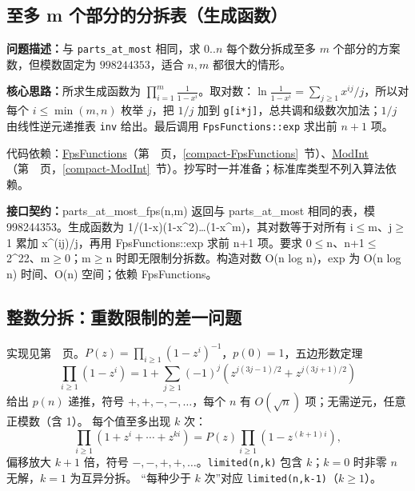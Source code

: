 \Needspace{334pt}

\subsection{至多 m 个部分的分拆表（生成函数）}\label{compact-parts_at_most_fps}

\noindent\textbf{问题描述：}\allowbreak 与 \texttt{parts\_at\_most} 相同，求 $0..n$ 每个数分拆成至多 $m$ 个部分的方案数，但模数固定为 $998244353$，适合 $n,m$ 都很大的情形。

\textbf{核心思路：}\allowbreak 所求生成函数为 $\prod_{i=1}^{m}\frac1{1-x^i}$。取对数：$\ln\frac1{1-x^i}=\sum_{j\ge1}x^{ij}/j$，所以对每个 $i\le\min(m,n)$ 枚举 $j$，把 $1/j$ 加到 \texttt{g[i*j]}，总共调和级数次加法；$1/j$ 由线性逆元递推表 \texttt{inv} 给出。最后调用 \texttt{FpsFunctions::exp} 求出前 $n+1$ 项。

代码依赖：\hyperref[compact-FpsFunctions]{FpsFunctions}（第~\pageref{compact-FpsFunctions}~页，\ref{compact-FpsFunctions}~节）、\hyperref[compact-ModInt]{ModInt}（第~\pageref{compact-ModInt}~页，\ref{compact-ModInt}~节）。抄写时一并准备；标准库类型不列入算法依赖。

{\sloppy{}\noindent\textbf{接口契约：}parts\_at\_most\_fps(n,m) 返回与 parts\_at\_most 相同的表，模 998244353。生成函数为 1/(1-x)(1-x\textasciicircum{}2)…(1-x\textasciicircum{}m)，其对数等于对所有 i$\le$m、j$\ge$1 累加 x\textasciicircum{}(ij)/j，再用 FpsFunctions::exp 求前 n+1 项。要求 0$\le$n、n+1$\le$2\textasciicircum{}22、m$\ge$0；m$\ge$n 时即无限制分拆数。构造对数 O(n log n)，exp 为 O(n log n) 时间、O(n) 空间；依赖 FpsFunctions。\par}



\newpage

\subsection{整数分拆：重数限制的差一问题}\label{knowledge-partitions}
实现见第~\pageref{compact-Partitions}~页。$P(z)=\prod_{i\ge1}(1-z^i)^{-1}$，$p(0)=1$，五边形数定理
\[
\prod_{i\ge1}(1-z^i)=1+\sum_{j\ge1}(-1)^j
\left(z^{j(3j-1)/2}+z^{j(3j+1)/2}\right)
\]
给出 $p(n)$ 递推，符号 $+,+,-,-,\ldots$，每个 $n$ 有 $O(\sqrt n)$ 项；无需逆元，任意正模数（含 1）。
每个值至多出现 $k$ 次：
\[
\prod_{i\ge1}(1+z^i+\cdots+z^{ki})=P(z)\prod_{i\ge1}(1-z^{(k+1)i}),
\]
偏移放大 $k+1$ 倍，符号 $-,-,+,+,\ldots$。\texttt{limited(n,k)} 包含 $k$；$k=0$ 时非零 $n$ 无解，$k=1$ 为互异分拆。
“每种少于 $k$ 次”对应 \texttt{limited(n,k-1)}（$k\ge1$）。

